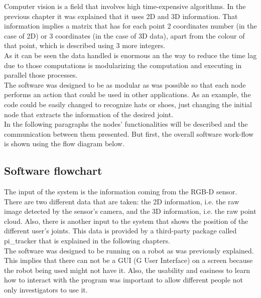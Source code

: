 Computer vision is a field that involves high time-expensive algorithms. In the previous chapter it was explained that it uses 2D and 3D information. That information implies a matrix that has for each point 2 coordinates number (in the case of 2D) or 3 coordinates (in the case of 3D data), apart from the colour of that point, which is described using 3 more integers. \\

As it can be seen the data handled is enormous an the way to reduce the time lag due to those computations is modularizing the computation and executing in parallel those processes. 
\\

The software was designed to be as modular as was possible so that each node performs an action that could be used in other applications. 
As an example, the code could be easily changed to recognize hats or shoes, just changing the initial node that extracts the information of the desired joint. 
\\

In the following paragraphs the nodes' functionalities will be described and the communication between them presented. But first, the overall software work-flow is shown using the flow diagram below. 

\newpage
\subsection{Software flowchart}

The input of the system is the information coming from the RGB-D sensor. There are two different data that are taken: the 2D information, i.e. the raw image detected by the sensor's camera, and the 3D information, i.e. the raw point cloud. Also, there is another input to the system that shows the position of the different user's joints. This data is provided by a third-party package called pi\_tracker that is explained in the following chapters. 
\\

The software was designed to be running on a robot as was previously explained. This implies that there can not be a GUI (G User Interface) on a screen because the robot being used might not have it. Also, the usability and easiness to learn how to interact with the program was important to allow different people not only investigators to use it. 
\\


